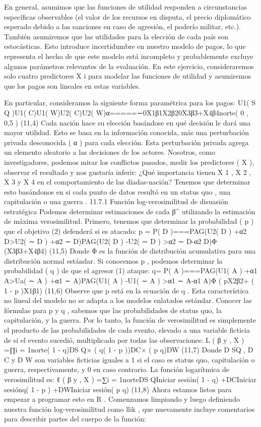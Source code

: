 \documentclass[
]{book}
\begin{document}
En general, asumimos que las funciones de utilidad responden a circunstancias específicas observables (el valor de los recursos en disputa, el precio diplomático esperado debido a las sanciones en caso de agresión, el poderío militar, etc.). También asumiremos que las utilidades para la elección de cada país son estocásticas. Esto introduce incertidumbre en nuestro modelo de pagos, lo que representa el hecho de que este modelo está incompleto y probablemente excluye algunos parámetros relevantes de la evaluación. En este ejercicio, consideraremos solo cuatro predictores X i para modelar las funciones de utilidad y asumiremos que los pagos son lineales en estas variables.

En particular, consideramos la siguiente forma paramétrica para los pagos:
U1( S Q )U1( C)U1( W)U2( C)U2( W)α=====∼0X1β1X2β20X3β3+X4β4norte( 0 , 0,5 )
(11,4)
Cada nación hace su elección basándose en qué decisión le dará una mayor utilidad. Esto se basa en la información conocida, más una perturbación privada desconocida ( α ) para cada elección. Esta perturbación privada agrega un elemento aleatorio a las decisiones de los actores. Nosotros, como investigadores, podemos mirar los conflictos pasados, medir los predictores ( X ), observar el resultado y nos gustaría inferir: ¿Qué importancia tienen X 1 , X 2 , X 3 y X 4 en el comportamiento de las díadas-nación? Tenemos que determinar esto basándonos en si cada punto de datos resultó en un status quo , una capitulación o una guerra .
11.7.1 Función log-verosimilitud de disuasión estratégica
Podemos determinar estimaciones de cada β\^{} utilizando la estimación de máxima verosimilitud. Primero, tenemos que determinar la probabilidad ( p ) que el objetivo (2) defenderá si es atacado:
p = P( D )===PAG(U2( D ) +α2 D\textgreater U2( ∼ D ) +α2 ∼ D)PAG(U2( D ) -U2( ∼ D ) \textgreater α2 ∼ D-α2 D)Φ (X3β3+X4β4)
(11,5)
Donde Φ es la función de distribución acumulativa para una distribución normal estándar. Si conocemos p , podemos determinar la probabilidad ( q ) de que el agresor (1) ataque:
q= P( A )===PAG(U1( A ) +α1 A\textgreater Ua( ∼ A ) +α1 ∼ A)PAG(U1( A ) -U1( ∼ A ) \textgreater α1 ∼ A-α1 A)Φ ( pX2β2+ ( 1 - p )X1β1)
(11,6)
Observe que p está en la ecuación de q . Esta característica no lineal del modelo no se adapta a los modelos enlatados estándar.
Conocer las fórmulas para p y q , sabemos que las probabilidades de status quo, la capitulación, y la guerra. Por lo tanto, la función de verosimilitud es simplemente el producto de las probabilidades de cada evento, elevado a una variable ficticia de si el evento sucedió, multiplicado por todas las observaciones:
L ( β \textbar{} y , X ) =∏i = 1norte( 1 - q)DS Q× ( q( 1 - p ))DC× ( p q)DW
(11,7)
Donde D SQ , D C y D W son variables ficticias iguales a 1 si el caso es status quo, capitulación o guerra, respectivamente, y 0 en caso contrario. La función logarítmica de verosimilitud es:
ℓ ( β \textbar{} y , X ) =∑i = 1norteDS QIniciar sesión( 1 - q) +DCIniciar sesiónq( 1 - p ) +DWIniciar sesión( p q)
(11,8)
Ahora estamos listos para empezar a programar esto en R . Comenzamos limpiando y luego definiendo nuestra función log-verosimilitud como llik , que nuevamente incluye comentarios para describir partes del cuerpo de la función:
\end{document}

